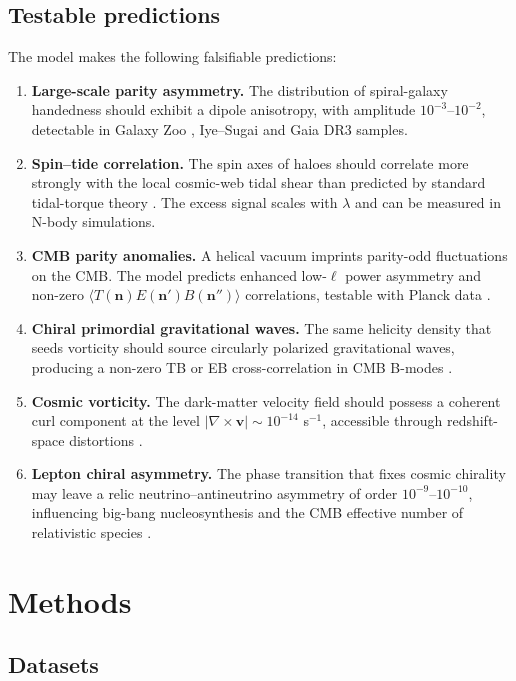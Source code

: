\documentclass[a4paper,10pt]{article}
\begin{document}
\subsection{Testable predictions}

The model makes the following falsifiable predictions:
\begin{enumerate}
\item \textbf{Large-scale parity asymmetry.} The distribution of spiral-galaxy
  handedness should exhibit a dipole anisotropy, with amplitude
  $10^{-3}$--$10^{-2}$, detectable in Galaxy Zoo \cite{galaxyzoo},
  Iye--Sugai \cite{iye} and Gaia DR3 \cite{gaia} samples.
\item \textbf{Spin--tide correlation.} The spin axes of haloes should correlate
  more strongly with the local cosmic-web tidal shear than predicted by
  standard tidal-torque theory \cite{leepen,codis}. The excess signal scales
  with $\lambda$ and can be measured in N-body simulations.
\item \textbf{CMB parity anomalies.} A helical vacuum imprints parity-odd
  fluctuations on the CMB. The model predicts enhanced low-$\ell$ power
  asymmetry and non-zero $\langle T(\mathbf{n})E(\mathbf{n}')B(\mathbf{n}'')
  \rangle$ correlations, testable with Planck data \cite{planck18}.
\item \textbf{Chiral primordial gravitational waves.} The same helicity
  density that seeds vorticity should source circularly polarized gravitational
  waves, producing a non-zero TB or EB cross-correlation in CMB B-modes
  \cite{bicep}.
\item \textbf{Cosmic vorticity.} The dark-matter velocity field should possess
  a coherent curl component at the level $|\nabla\times\mathbf{v}|\sim
  10^{-14}$ s$^{-1}$, accessible through redshift-space distortions
  \cite{sdss}.
\item \textbf{Lepton chiral asymmetry.} The phase transition that fixes cosmic
  chirality may leave a relic neutrino--antineutrino asymmetry of order
  $10^{-9}$--$10^{-10}$, influencing big-bang nucleosynthesis and the CMB
  effective number of relativistic species \cite{goldhaber,christenson}.
\end{enumerate}

\section{Methods}

\subsection{Datasets}
\end{document}
